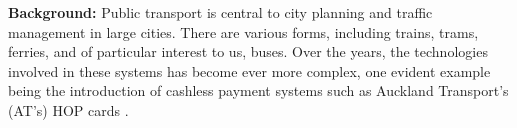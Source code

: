 \documentclass[12pt,a4paper]{article}
\begin{document}













\textbf{Background:}
Public transport is central to city planning and traffic management in large cities.
There are various forms, including trains, trams, ferries, and of particular interest to us, buses.
Over the years, the technologies involved in these systems has become ever more complex,
one evident example being the introduction of cashless payment systems such as 
Auckland Transport's (AT's) HOP cards \citep{cn}.
\end{document}
